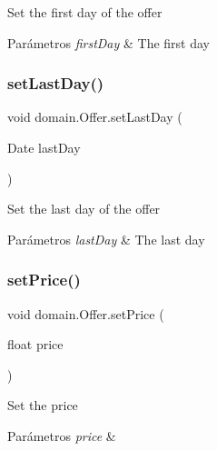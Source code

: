 Set the first day of the offer


\begin{DoxyParams}{Parámetros}
{\em first\+Day} & The first day \\
\hline
\end{DoxyParams}
\mbox{\label{classdomain_1_1_offer_a52363278771059c51820160889c2bed1}} 
\subsubsection{\texorpdfstring{setLastDay()}{setLastDay()}}
{\footnotesize\ttfamily void domain.\+Offer.\+set\+Last\+Day (\begin{DoxyParamCaption}\item[{Date}]{last\+Day }\end{DoxyParamCaption})}

Set the last day of the offer


\begin{DoxyParams}{Parámetros}
{\em last\+Day} & The last day \\
\hline
\end{DoxyParams}
\mbox{\label{classdomain_1_1_offer_a8bd526902732e030571b6889c5507f4c}} 
\subsubsection{\texorpdfstring{setPrice()}{setPrice()}}
{\footnotesize\ttfamily void domain.\+Offer.\+set\+Price (\begin{DoxyParamCaption}\item[{float}]{price }\end{DoxyParamCaption})}

Set the price


\begin{DoxyParams}{Parámetros}
{\em price} & \\
\hline
\end{DoxyParams}
\mbox{\label{classdomain_1_1_offer_ac79a4a4efc643fb5bd0e8a423c96dde4}} 
